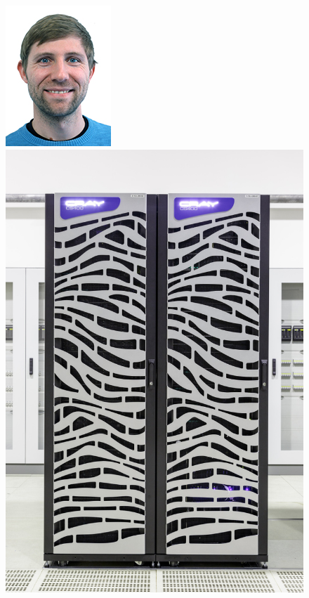 \documentclass[aspectratio=169]{beamer}
\begin{document}
\begin{frame}
\begin{columns}
\begin{column}{0.48\textwidth}
\begin{figure}
            \includegraphics[width=0.25\linewidth]{andreas.jpg}\quad \includegraphics[width=0.25\linewidth]{juron.jpg} \\
        \end{figure}
    \end{column}
\end{columns}
\end{frame}
\end{document}

